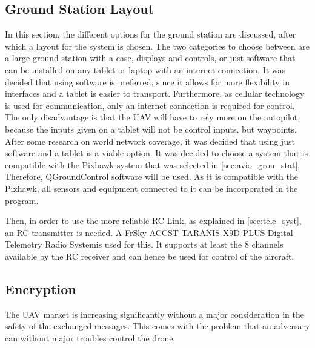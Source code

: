 \subsection{Ground Station Layout}%
\label{sec:grou_stat_layo}


In this section, the different options for the ground station are discussed, after which a layout for the system is chosen. %
The two categories to choose between are a large ground station with a case, displays and controls, or just software that can be installed on any tablet or laptop with an internet connection. It was decided that using software is preferred, since it allows for more flexibility in interfaces and a tablet is easier to transport. Furthermore, as cellular technology is used for communication, only an internet connection is required for control. The only disadvantage is that the UAV will have to rely more on the autopilot, because the inputs given on a tablet will not be control inputs, but waypoints. After some research on world network coverage, it was decided that using just software and a tablet is a viable option\footnotemark.
It was decided to choose a system that is compatible with the Pixhawk system that was selected in \autoref{sec:avio_grou_stat}. Therefore, QGroundControl software will be used\footnotemark. As it is compatible with the Pixhawk, all sensors and equipment connected to it can be incorporated in the program.


Then, in order to use the more reliable RC Link, as explained in \autoref{sec:tele_syst}, an RC transmitter is needed. A FrSky ACCST TARANIS X9D PLUS Digital Telemetry Radio System\footnotemark is used for this. It supports at least the 8 channels available by the RC receiver and can hence be used for control of the aircraft.





\subsection{Encryption}%
\label{sec:encr}

The UAV market is increasing significantly without a major consideration in the safety of the exchanged messages. This comes with the problem that an adversary can without major troubles control the drone. 

